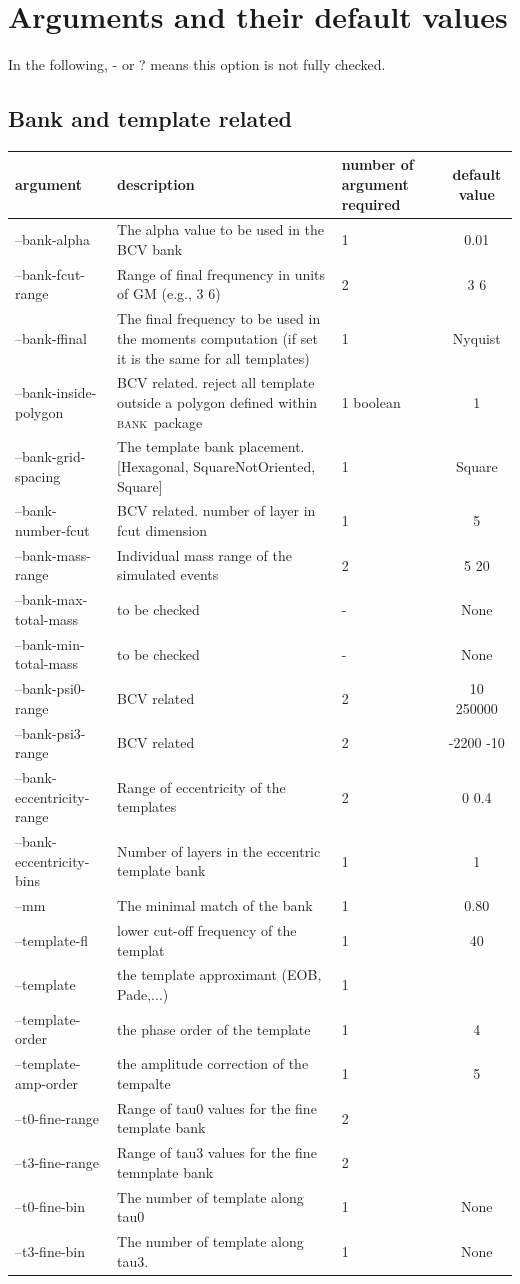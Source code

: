 \documentclass[a4paper,10pt]{article}
\newcommand{\bank}{\textsc{bank}~}
\begin{document}
\section{Arguments and their default values}\label{default}
In the following, - or ? means this option is not fully checked.
\subsection{Bank and template related}
\begin{center}
\begin{tabular}{|l|p{6cm}|p{3cm}|c|}
\hline
argument &  description & number of argument required &default value \\ \hline
--bank-alpha & The alpha value to be used in the BCV bank & 1 &0.01 \\ \hline
--bank-fcut-range & Range of final frequnency in units of GM (e.g., 3 6)& 2& 3 6  \\ \hline
--bank-ffinal & The final frequency to be used in the moments computation (if set it is the same for all templates) &1 &Nyquist\\\hline
--bank-inside-polygon & BCV related. reject all template outside a polygon defined within \bank package & 1 boolean & 1\\\hline
--bank-grid-spacing & The template bank placement. [Hexagonal, SquareNotOriented, Square] & 1 & Square\\\hline
--bank-number-fcut & BCV related. number of layer in fcut dimension& 1&5\\\hline
--bank-mass-range &Individual mass range of the simulated events&2&5 20\\\hline
--bank-max-total-mass& to be checked&-& None\\\hline
--bank-min-total-mass&to be checked&-& None\\\hline
--bank-psi0-range &BCV related&2&10 250000\\\hline
--bank-psi3-range &BCV related&2&-2200 -10\\\hline
--bank-eccentricity-range & Range of eccentricity of the templates & 2 & 0 0.4 \\\hline
--bank-eccentricity-bins&Number of layers in the eccentric template bank&1&1\\\hline 
--mm &The minimal match of the bank&1&0.80\\\hline
--template-fl  &lower cut-off frequency of the templat &1&40\\\hline
--template  &the template approximant (EOB, Pade,...)&1&\\\hline
--template-order &the phase order of the template&1&4\\\hline
--template-amp-order &the amplitude correction of the tempalte&1&5\\\hline
--t0-fine-range &Range of tau0 values for the fine template bank&2&\\\hline
--t3-fine-range &Range of tau3 values for the fine temnplate bank&2&\\\hline
--t0-fine-bin &The number of template along tau0 &1&None\\\hline
--t3-fine-bin &The number of template along tau3. &1&None\\\hline


\end{tabular}
\end{center}
\end{document}
